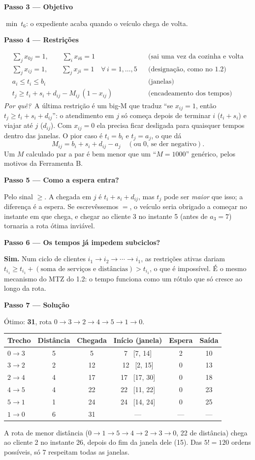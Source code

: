 \documentclass[11pt,a4paper]{article}
\newcommand{\passo}[1]{\par\medskip\textbf{#1}\par}
\newcommand{\porque}{\textit{Por quê?}\ }
\begin{document}
\passo{Passo 3 --- Objetivo}
$\min\ t_6$: o expediente acaba quando o veículo chega de volta.

\passo{Passo 4 --- Restrições}
\begin{align*}
  & \textstyle\sum_{j} x_{0j}=1,\qquad \sum_{i} x_{i6}=1 && \text{(sai uma vez da cozinha e volta uma vez)}\\
  & \textstyle\sum_{j} x_{ij}=1,\qquad \sum_{j} x_{ji}=1 \quad \forall\, i=1,\dots,5 && \text{(designação, como no 1.2)}\\
  & a_i \le t_i \le b_i && \text{(janelas)}\\
  & t_j \ge t_i + s_i + d_{ij} - M_{ij}\,(1-x_{ij}) && \text{(encadeamento dos tempos)}
\end{align*}
\porque A última restrição é um big-M que traduz ``se $x_{ij}=1$, então $t_j\ge t_i+s_i+d_{ij}$'': o
atendimento em $j$ só começa depois de terminar $i$ ($t_i+s_i$) e viajar até $j$ ($d_{ij}$). Com $x_{ij}=0$
ela precisa ficar desligada para quaisquer tempos dentro das janelas. O pior caso é $t_i=b_i$ e $t_j=a_j$,
o que dá
\[
  M_{ij} = b_i + s_i + d_{ij} - a_j \quad(\text{ou 0, se der negativo}).
\]
Um $M$ calculado par a par é bem menor que um ``$M=1000$'' genérico, pelos motivos da Ferramenta B.

\passo{Passo 5 --- Como a espera entra?}
Pelo sinal $\ge$. A chegada em $j$ é $t_i+s_i+d_{ij}$, mas $t_j$ pode ser \emph{maior} que isso; a diferença é
a espera. Se escrevêssemos $=$, o veículo seria obrigado a começar no instante em que chega, e chegar ao
cliente 3 no instante 5 (antes de $a_3=7$) tornaria a rota ótima inviável.

\passo{Passo 6 --- Os tempos já impedem subciclos?}
\textbf{Sim.} Num ciclo de clientes $i_1\to i_2\to\cdots\to i_1$, as restrições ativas dariam
$t_{i_1}\ge t_{i_1}+(\text{soma de serviços e distâncias})>t_{i_1}$, o que é impossível. É o mesmo mecanismo do MTZ
do 1.2: o tempo funciona como um rótulo que só cresce ao longo da rota.

\passo{Passo 7 --- Solução}
Ótimo: \textbf{31}, rota $0\to3\to2\to4\to5\to1\to0$.
\begin{center}
\begin{tabular}{lccccc}
\toprule
Trecho & Distância & Chegada & Início (janela) & Espera & Saída\\
\midrule
$0\to3$ & 5 & 5  & 7 \ [7, 14]   & 2 & 10\\
$3\to2$ & 2 & 12 & 12 \ [2, 15]  & 0 & 13\\
$2\to4$ & 4 & 17 & 17 \ [17, 30] & 0 & 18\\
$4\to5$ & 4 & 22 & 22 \ [11, 22] & 0 & 23\\
$5\to1$ & 1 & 24 & 24 \ [14, 24] & 0 & 25\\
$1\to0$ & 6 & 31 & ---           & --- & ---\\
\bottomrule
\end{tabular}
\end{center}
A rota de menor distância ($0\to1\to5\to4\to2\to3\to0$, 22 de distância) chega ao cliente 2 no instante
26, depois do fim da janela dele (15). Das $5!=120$ ordens possíveis, só 7 respeitam todas as janelas.
\end{document}
